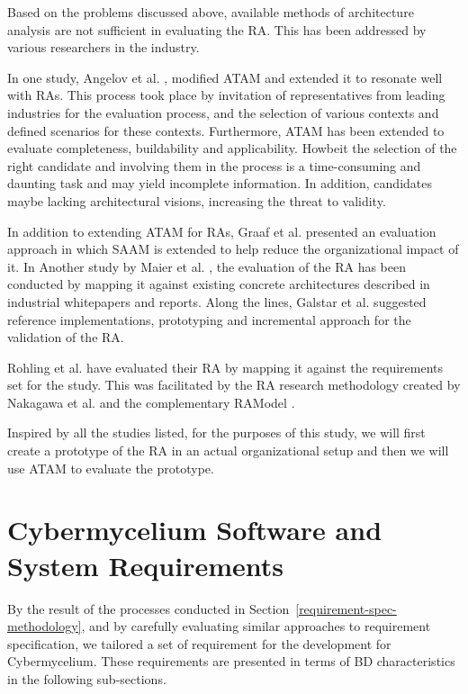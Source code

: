 \documentclass[review]{elsarticle}
\begin{document}
Based on the problems discussed above, available methods of architecture analysis are not sufficient in evaluating the RA. This has been addressed by various researchers in the industry.

In one study, Angelov et al. \cite{angelov2008towards}, modified ATAM and extended it to resonate well with RAs. This process took place by invitation of representatives from leading industries for the evaluation process, and the selection of various contexts and defined scenarios for these contexts. Furthermore, ATAM has been extended to evaluate completeness, buildability and applicability. Howbeit the selection of the right candidate and involving them in the process is a time-consuming and daunting task and may yield incomplete information. In addition, candidates maybe lacking architectural visions, increasing the threat to validity.

In addition to extending ATAM for RAs, Graaf et al. \cite{graaf2005evaluating} presented an evaluation approach in which SAAM is extended to help reduce the organizational impact of it. In Another study by Maier et al. \cite{Maier}, the evaluation of the RA has been conducted by mapping it against existing concrete architectures described in industrial whitepapers and reports. Along the lines, Galstar et al. \cite{galster2011empirically} suggested reference implementations, prototyping and incremental approach for the validation of the RA.

Rohling et al. \cite{rohling2019reference} have evaluated their RA by mapping it against the requirements set for the study. This was facilitated by the RA research methodology created by Nakagawa et al. \cite{Nakagawa} and the complementary RAModel \cite{nakagawa2012ramodel}.

Inspired by all the studies listed, for the purposes of this study, we will first create a prototype of the RA in an actual organizational setup and then we will use ATAM to evaluate the prototype.

\section{Cybermycelium Software and System Requirements} \label{requirements-section}

By the result of the processes conducted in Section~\ref{requirement-spec-methodology}, and by carefully evaluating similar approaches to requirement specification, we tailored a set of requirement for the development for Cybermycelium. These requirements are presented in terms of BD characteristics in the following sub-sections.
\end{document}
